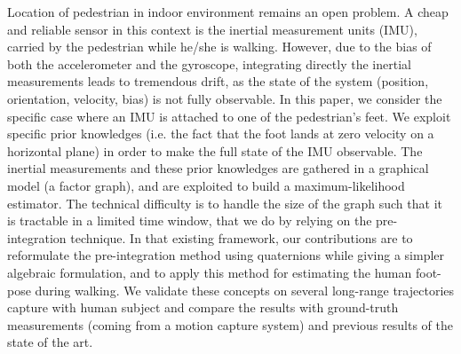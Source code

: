 %
%
Location of pedestrian in indoor environment remains an open problem.
A cheap and reliable sensor in this context is the inertial measurement units (IMU), carried by the pedestrian while he/she is walking.
However, due to the bias of both the accelerometer and the gyroscope, integrating directly the inertial measurements leads to tremendous drift, as the state of the system (position, orientation, velocity, bias) is not fully observable. 
In this paper, we consider the specific case where an IMU is attached to one of the pedestrian's feet.
We exploit specific prior knowledges (i.e. the fact that the foot lands at zero velocity on a horizontal plane) in order to make the full state of the IMU observable.
The inertial measurements and these prior knowledges are gathered in a graphical model (a factor graph), and are exploited to build a maximum-likelihood estimator.
The technical difficulty is to handle the size of the graph such that it is tractable in a limited time window, that we do by relying on the pre-integration technique.
In that existing framework, our contributions are to reformulate the pre-integration method using quaternions while giving a simpler algebraic formulation, and to apply this method for estimating the human foot-pose during walking.
We validate these concepts on several long-range trajectories capture with human subject and compare the results with ground-truth measurements (coming from a motion capture system) and previous results of the state of the art.



